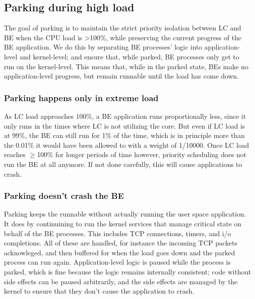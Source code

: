 \subsection{Parking during high load}\label{ss:approach:parking}

The goal of parking is to maintain the strict priority isolation between LC and
BE when the CPU load is >100\%, while preserving the current progress of the BE
application. We do this by separating BE processes' logic into application-level
and kernel-level; and ensure that, while parked, BE processes only get to run on
the kernel-level. This means that, while in the parked state, BEs make no
application-level progress, but remain runnable until the load has come down.

\subsubsection{Parking happens only in extreme load}
As LC load approaches 100\%, a BE application runs proportionally less, since it
only runs in the times where LC is not utilizing the core. But even if LC load
is at 99\%, the BE can still run for 1\% of the time, which is in principle more
than the 0.01\% it would have been allowed to with a weight of 1/10000. Once LC
load reaches $\geq$100\% for longer periods of time however, priority scheduling
does not run the BE at all anymore. If not done carefully, this will cause
applications to crash.

\subsubsection{Parking doesn't crash the BE}
Parking keeps the runnable without actually running the user space application.
It does by continuining to run the kernel services that manage critical state on
behalf of the BE processes. This includes TCP connections, timers, and i/o
completions. All of these are handled, for instance the incoming TCP packets
acknowleged, and then buffered for when the load goes down and the parked
process can run again. Application-level logic is paused while the process is
parked, which is fine because the logic remains internally consistent; code
without side effects can be paused arbitrarily, and the side effects are managed
by the kernel to ensure that they don't cause the application to
crash.

